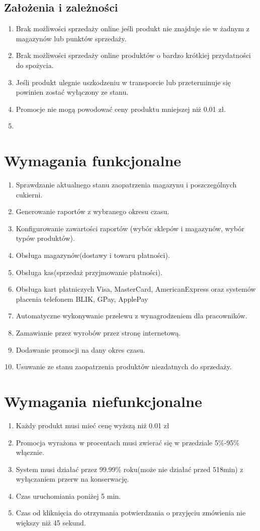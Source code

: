 \documentclass{article}
\begin{document}
\subsection{Założenia i zależności}
\begin{enumerate}
    \item Brak możliwości sprzedaży online jeśli produkt nie znajduje sie w żadnym z magazynów lub punktów sprzedaży.
    \item Brak możliwości sprzedaży online produktów o bardzo krótkiej przydatności do spożycia.
    \item Jeśli produkt ulegnie uszkodzeniu w transporcie lub przeterminuje się powinien zostać wyłączony ze stanu.
    \item Promocje nie mogą powodować ceny produktu mniejszej niż 0.01 zł.
    \item 
\end{enumerate}
\section{Wymagania funkcjonalne}
\begin{enumerate}
\item Sprawdzanie aktualnego stanu zaopatrzenia magazynu i poszczególnych cukierni.
\item Generowanie raportów z wybranego okresu czasu.
\item Konfigurowanie zawartości raportów (wybór sklepów i magazynów, wybór typów produktów).
\item Obsługa magazynów(dostawy i towaru płatności).
\item Obsługa kas(sprzedaż przyjmowanie płatności).
\item Obsługa kart płatniczych Visa, MasterCard, AmericanExpress oraz systemów płacenia telefonem BLIK, GPay, ApplePay
\item Automatyczne wykonywanie przelewu z wynagrodzeniem dla pracowników.
\item Zamawianie przez wyrobów przez stronę internetową.
\item Dodawanie promocji na dany okres czasu.
\item Usuwanie ze stanu zaopatrzenia produktów niezdatnych do sprzedaży.
\end{enumerate}
\section{Wymagania niefunkcjonalne}
\begin{enumerate}
\item Każdy produkt musi mieć cenę wyższą niż 0.01 zł
\item Promocja wyrażona w procentach musi zwierać się w przedziale 5\%-95\% włącznie.
\item System musi działać przez 99.99\% roku(może nie działać przed 518min) z wyłączaniem przerw na konserwację.
\item Czas uruchomiania poniżej 5 min.
\item Czas od kliknięcia do otrzymania potwierdzania o przyjęciu zmówienia nie większy niż 45 sekund. 
\end{enumerate}
\end{document}
